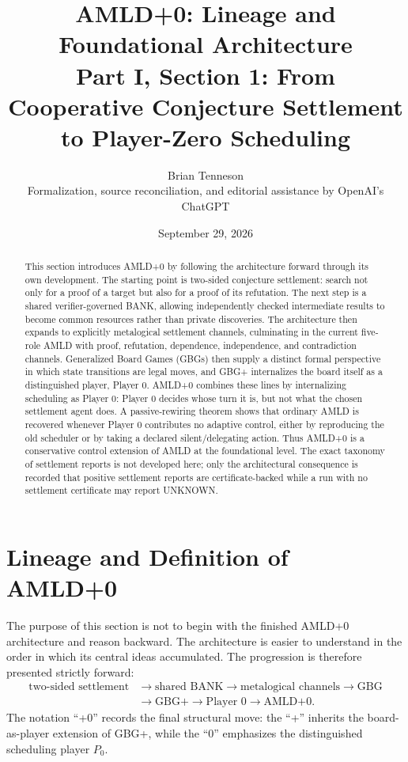 \documentclass[11pt]{article}
\title{\textbf{AMLD+0: Lineage and Foundational Architecture}\\[0.5em]
\large Part I, Section 1: From Cooperative Conjecture Settlement to Player-Zero Scheduling}
\author{Brian Tenneson\\[0.25em]
\small Formalization, source reconciliation, and editorial assistance by OpenAI's ChatGPT}
\date{September 29, 2026}
\begin{document}
\maketitle

\begin{abstract}
This section introduces AMLD+0 by following the architecture forward through its own development. The starting point is two-sided conjecture settlement: search not only for a proof of a target but also for a proof of its refutation. The next step is a shared verifier-governed BANK, allowing independently checked intermediate results to become common resources rather than private discoveries. The architecture then expands to explicitly metalogical settlement channels, culminating in the current five-role AMLD with proof, refutation, dependence, independence, and contradiction channels. Generalized Board Games (GBGs) then supply a distinct formal perspective in which state transitions are legal moves, and GBG+ internalizes the board itself as a distinguished player, Player 0. AMLD+0 combines these lines by internalizing scheduling as Player 0: Player 0 decides whose turn it is, but not what the chosen settlement agent does. A passive-rewiring theorem shows that ordinary AMLD is recovered whenever Player 0 contributes no adaptive control, either by reproducing the old scheduler or by taking a declared silent/delegating action. Thus AMLD+0 is a conservative control extension of AMLD at the foundational level. The exact taxonomy of settlement reports is not developed here; only the architectural consequence is recorded that positive settlement reports are certificate-backed while a run with no settlement certificate may report UNKNOWN.
\end{abstract}

\section{Lineage and Definition of AMLD+0}

The purpose of this section is not to begin with the finished AMLD+0 architecture and reason backward. The architecture is easier to understand in the order in which its central ideas accumulated. The progression is therefore presented strictly forward:
\[
\begin{aligned}
\text{two-sided settlement} &\longrightarrow \text{shared BANK}
\longrightarrow \text{metalogical channels} \longrightarrow \text{GBG}\\
&\longrightarrow \text{GBG+} \longrightarrow \text{Player 0} \longrightarrow \text{AMLD+0}.
\end{aligned}
\]
The notation ``+0'' records the final structural move: the ``+'' inherits the board-as-player extension of GBG+, while the ``0'' emphasizes the distinguished scheduling player $P_0$.
\end{document}
